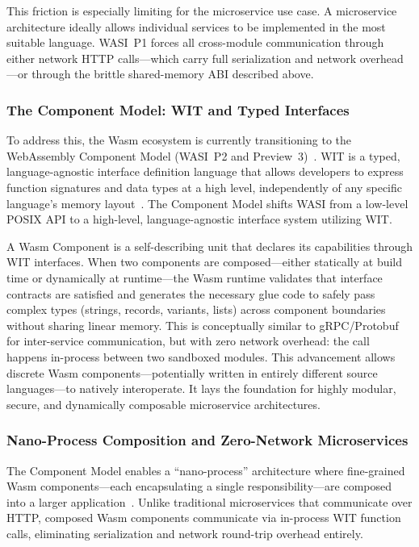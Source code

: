 This friction is especially limiting for the microservice use case. A microservice architecture ideally allows individual services to be implemented in the most suitable language. \acs{WASI}~P1 forces all cross-module communication through either network \acs{HTTP} calls---which carry full serialization and network overhead---or through the brittle shared-memory \acs{ABI} described above.

\subsubsection{The Component Model: WIT and Typed Interfaces}
To address this, the \acs{Wasm} ecosystem is currently transitioning to the WebAssembly Component Model (\acs{WASI}~P2 and Preview~3)~\cite{bytecodealliance2024componentmodel}. \ac{WIT} is a typed, language-agnostic interface definition language that allows developers to express function signatures and data types at a high level, independently of any specific language's memory layout~\cite{bytecodealliance2024componentmodel}. The Component Model shifts \acs{WASI} from a low-level \acs{POSIX} \acs{API} to a high-level, language-agnostic interface system utilizing \acs{WIT}.

A \acs{Wasm} Component is a self-describing unit that declares its capabilities through \acs{WIT} interfaces. When two components are composed---either statically at build time or dynamically at runtime---the \acs{Wasm} runtime validates that interface contracts are satisfied and generates the necessary glue code to safely pass complex types (strings, records, variants, lists) across component boundaries without sharing linear memory. This is conceptually similar to \ac{gRPC}/Protobuf for inter-service communication, but with zero network overhead: the call happens in-process between two sandboxed modules. This advancement allows discrete \acs{Wasm} components---potentially written in entirely different source languages---to natively interoperate. It lays the foundation for highly modular, secure, and dynamically composable microservice architectures.

\subsubsection{Nano-Process Composition and Zero-Network Microservices}
The Component Model enables a ``nano-process'' architecture where fine-grained \acs{Wasm} components---each encapsulating a single responsibility---are composed into a larger application~\cite{bytecodealliance2024componentmodel}. Unlike traditional microservices that communicate over \acs{HTTP}, composed \acs{Wasm} components communicate via in-process \acs{WIT} function calls, eliminating serialization and network round-trip overhead entirely.

